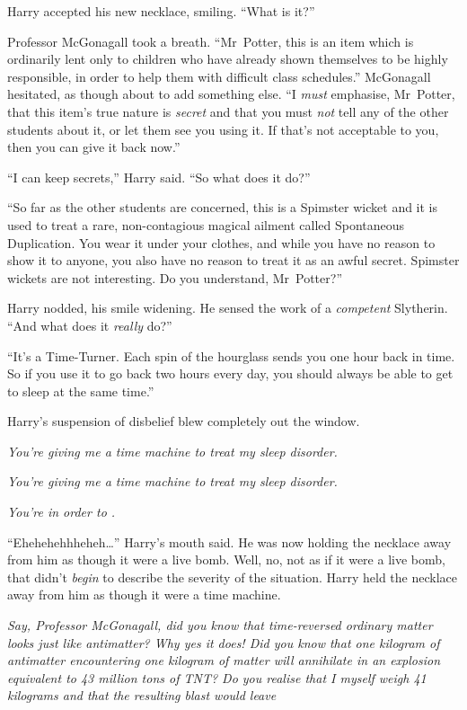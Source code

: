 Harry accepted his new necklace, smiling. “What is it?”

Professor McGonagall took a breath. “Mr~Potter, this is an item which is ordinarily lent only to children who have already shown themselves to be highly responsible, in order to help them with difficult class schedules.” McGonagall hesitated, as though about to add something else. “I \emph{must} emphasise, Mr~Potter, that this item’s true nature is \emph{secret} and that you must \emph{not} tell any of the other students about it, or let them see you using it. If that’s not acceptable to you, then you can give it back now.”

“I can keep secrets,” Harry said. “So what does it do?”

“So far as the other students are concerned, this is a Spimster wicket and it is used to treat a rare, non-contagious magical ailment called Spontaneous Duplication. You wear it under your clothes, and while you have no reason to show it to anyone, you also have no reason to treat it as an awful secret. Spimster wickets are not interesting. Do you understand, Mr~Potter?”

Harry nodded, his smile widening. He sensed the work of a \emph{competent} Slytherin. “And what does it \emph{really} do?”

“It’s a Time-Turner. Each spin of the hourglass sends you one hour back in time. So if you use it to go back two hours every day, you should always be able to get to sleep at the same time.”

Harry’s suspension of disbelief blew completely out the window.

\emph{You’re giving me a time machine to treat my sleep disorder.}

\emph{You’re giving me a \emph{time machine} to treat my \emph{sleep disorder.}}

\emph{You’re  in order to
.}

“Ehehehehhheheh…” Harry’s mouth said. He was now holding the necklace away from him as though it were a live bomb. Well, no, not as if it were a live bomb, that didn’t \emph{begin} to describe the severity of the situation. Harry held the necklace away from him as though it were a time machine.

\emph{Say, Professor McGonagall, did you know that time-reversed ordinary matter looks just like antimatter? Why yes it does! Did you know that one kilogram of antimatter encountering one kilogram of matter will annihilate in an explosion equivalent to 43 million tons of TNT? Do you realise that I myself weigh 41 kilograms and that the resulting blast would leave }

